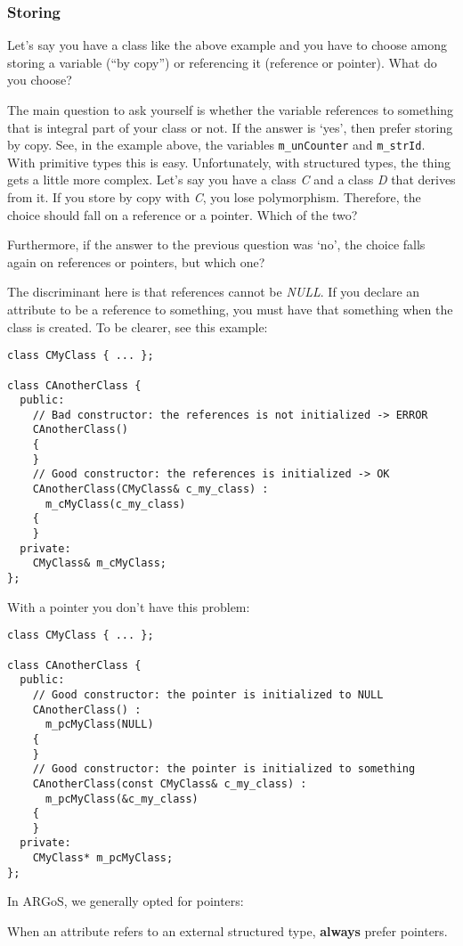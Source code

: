 \documentclass[a4paper]{article}
\newcommand{\argos}{ARGoS\xspace}
\begin{document}
\subsubsection{Storing}
Let's say you have a class like the above example and you have to
choose among storing a variable (``by copy'') or referencing it
(reference or pointer). What do you choose?

The main question to ask yourself is whether the variable references
to something that is integral part of your class or not. If the answer
is `yes', then prefer storing by copy. See, in the example above, the
variables \lstinline!m_unCounter! and \lstinline!m_strId!.  With
primitive types this is easy. Unfortunately, with structured types,
the thing gets a little more complex. Let's say you have a class {\it
C} and a class {\it D} that derives from it. If you store by copy
with {\it C}, you lose polymorphism. Therefore, the choice should fall
on a reference or a pointer. Which of the two?

Furthermore, if the answer to the previous question was `no', the
choice falls again on references or pointers, but which one?

The discriminant here is that references cannot be {\it NULL}. If you
declare an attribute to be a reference to something, you must have
that something when the class is created. To be clearer, see this
example:
%
\begin{lstlisting}
class CMyClass { ... };

class CAnotherClass {
  public:
    // Bad constructor: the references is not initialized -> ERROR
    CAnotherClass()
    {
    }
    // Good constructor: the references is initialized -> OK
    CAnotherClass(CMyClass& c_my_class) :
      m_cMyClass(c_my_class)
    {
    }
  private:
    CMyClass& m_cMyClass;
};
\end{lstlisting}
%
With a pointer you don't have this problem:
%
\begin{lstlisting}
class CMyClass { ... };

class CAnotherClass {
  public:
    // Good constructor: the pointer is initialized to NULL
    CAnotherClass() :
      m_pcMyClass(NULL)
    {
    }
    // Good constructor: the pointer is initialized to something
    CAnotherClass(const CMyClass& c_my_class) :
      m_pcMyClass(&c_my_class)
    {
    }
  private:
    CMyClass* m_pcMyClass;
};
\end{lstlisting}
%
In \argos, we generally opted for pointers:
\begin{warning}
  When an attribute refers to an external structured type, {\bf
    always} prefer pointers.
\end{warning}
\end{document}
